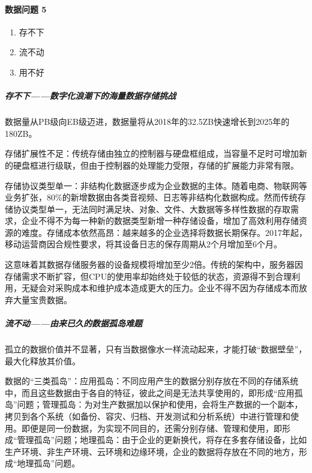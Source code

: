 \documentclass[letterpaper,11pt,english]{sphinxmanual}
\begin{document}
\paragraph{数据问题 5\sphinxfootnotemark[324]}
\label{\detokenize{chapter_idea/data:id24}}%
\begin{footnotetext}[324]\sphinxAtStartFootnote
{}
%
\end{footnotetext}\ignorespaces \begin{enumerate}
%
\item {} 
存不下

\item {} 
流不动

\item {} 
用不好

\end{enumerate}


\subparagraph{存不下——数字化浪潮下的海量数据存储挑战}
\label{\detokenize{chapter_idea/data:id25}}
数据量从PB级向EB级迈进，数据量将从2018年的32.5ZB快速增长到2025年的180ZB。

存储扩展性不足：传统存储由独立的控制器与硬盘框组成，当容量不足时可增加新的硬盘框进行级联，但由于控制器的处理能力受限，存储的扩展能力非常有限。

存储协议类型单一：非结构化数据逐步成为企业数据的主体。随着电商、物联网等业务扩张，80\%的新增数据由各类音视频、日志等非结构化数据构成。然而传统存储协议类型单一，无法同时满足块、对象、文件、大数据等多样性数据的存取需求，企业不得不为每一种新的数据类型新增一种存储设备，增加了高效利用存储资源的难度。存储成本依然高昂：越来越多的企业选择将数据长期保存。2017年起，移动运营商因合规性要求，将其设备日志的保存周期从2个月增加至6个月。

这意味着其数据存储服务器的设备规模将增加至少2倍。传统的架构中，服务器因存储需求不断扩容，但CPU的使用率却始终处于较低的状态，资源得不到合理利用，无疑会对采购成本和维护成本造成更大的压力。企业不得不因为存储成本而放弃大量宝贵数据。


\subparagraph{流不动——由来已久的数据孤岛难题}
\label{\detokenize{chapter_idea/data:id26}}
孤立的数据价值并不显著，只有当数据像水一样流动起来，才能打破“数据壁垒”，最大化释放其价值。

数据的“三类孤岛”：应用孤岛：不同应用产生的数据分别存放在不同的存储系统中，而且这些数据由于各自的特征，彼此之间是无法共享使用的，即形成“应用孤岛”问题；管理孤岛：为对生产数据加以保护和使用，会将生产数据的一个副本，拷贝到各个系统（如备份、容灾、归档、开发测试和分析系统）中进行管理和使用。即便是同一份数据，为实现不同目的，还需分别存储、管理和使用，即形成“管理孤岛”问题；地理孤岛：由于企业的更新换代，将存在多套存储设备，比如生产环境、非生产环境、云环境和边缘环境，企业的数据将存放在不同的地方，形成“地理孤岛”问题。
\end{document}
